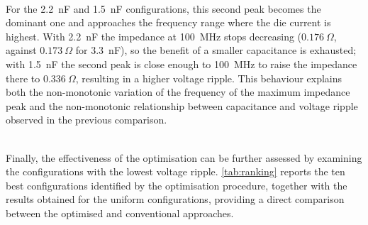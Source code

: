\noindent\\ For the 2.2~nF and 1.5~nF configurations, this second peak becomes the
dominant one and approaches the frequency range where the die current is
highest. With 2.2~nF the impedance at 100~MHz stops decreasing
($0.176~\Omega$, against $0.173~\Omega$ for 3.3~nF), so the benefit of
a smaller capacitance is exhausted; with 1.5~nF the second peak is close
enough to 100~MHz to raise the impedance there to $0.336~\Omega$,
resulting in a higher voltage ripple. This behaviour explains both the
non-monotonic variation of the frequency of the maximum impedance peak
and the non-monotonic relationship between capacitance and voltage
ripple observed in the previous comparison.

\noindent\\ Finally, the effectiveness of the optimisation can be further assessed by examining the configurations with the lowest voltage ripple.
\autoref{tab:ranking} reports the ten best configurations identified by the optimisation procedure, together with the results obtained
for the uniform configurations, providing a direct comparison between the optimised and conventional approaches.

